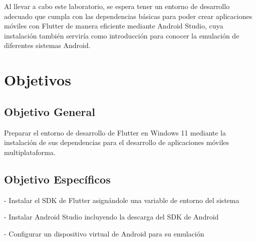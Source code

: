 \documentclass[12pt,letterpaper]{article}
\begin{document}
Al llevar a cabo este laboratorio, se espera tener un entorno de desarrollo adecuado que cumpla con las dependencias básicas para poder crear aplicaciones móviles con Flutter de manera eficiente mediante Android Studio, cuya instalación también serviría como introducción para conocer la emulación de diferentes sistemas Android.

\newpage


\renewcommand{\contentsname}{Índice de Contenidos}
{\setlength{\parskip}{0pt}
\tableofcontents
}

\vspace{1.0cm}

\renewcommand{\listfigurename}{Índice de Ilustraciones}
{\setlength{\cftbeforefigskip}{2pt}
\listoffigures
}

\newpage


\section{Objetivos}
\subsection{Objetivo General}
Preparar el entorno de desarrollo de Flutter en Windows 11 mediante la instalación de sus dependencias para el desarrollo de aplicaciones móviles multiplataforma.

\subsection{Objetivo Específicos}
- Instalar el SDK de Flutter asignándole una variable de entorno del sistema

- Instalar Android Studio incluyendo la descarga del SDK de Android

- Configurar un dispositivo virtual de Android para su emulación


\end{document}
